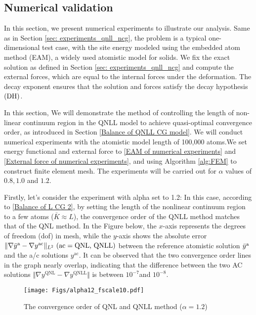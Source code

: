\subsection{Numerical validation}
\label{sec: experiments_qnll_cg}

In this section, we present numerical experiments to illustrate our analysis. Same as in Section \ref{sec: experiments_qnll_ncg}, the problem is a typical one-dimensional test case, with the site energy modeled using the embedded atom method (EAM), a widely used atomistic model for solids. We fix the exact solution as defined in Section \ref{sec: experiments_qnll_ncg} and compute the external forces, which are equal to the internal forces under the deformation. The decay exponent ensures that the solution and forces satisfy the decay hypothesis $\textbf{\rm (DH)}$.

In this section, We will demonstrate the method of controlling the length of non-linear continuum region in the QNLL model to achieve quasi-optimal convergence order, as introduced in Section \ref{Balance of QNLL CG model}. We will conduct numerical experiments with the atomistic model length of 100,000 atoms.We set energy functional and external force to \eqref{EAM of numerical experiments} and \eqref{External force of numerical experiments}, and using Algorithm \ref{alg:FEM} to construct finite element mesh. The experiments will be carried out for $\alpha$ values of $0.8, 1.0$ and $1.2$.

Firstly, let's consider the experiment with alpha set to 1.2: In this case, according to \eqref{Balance of L CG 2}, by setting the length of the nonlinear continuum region to a few atoms ($\bar{K} \approx L$), the convergence order of the QNLL method matches that of the QNL method. In the Figure below, the $x$-axis represents the degrees of freedom (dof) in mesh, while the $y$-axis shows the absolute error $\Vert \nabla \bar{y}^{{\rm a}} - \nabla y^{\text{ac}} \Vert_{L^{2}}~\text{(ac} = \text{QNL, QNLL)}$ between the reference atomistic solution $\bar{y}^{{\rm a}}$ and the a/c solutions $y^{\text{ac}}$. It can be observed that the two convergence order lines in the graph nearly overlap, indicating that the difference between the two AC solutions $\Vert \nabla y^{\text{QNL}} - \nabla y^{\text{QNLL}}\Vert$ is between $10^{-7} $and $10^{-8}$.

\begin{figure}[h]
	\centering 
	\texttt{[image: Figs/alpha12\_fscale10.pdf]}
	\caption{The convergence order of QNL and QNLL method ($\alpha = 1.2$)} %
	\label{fig: convergence_QNL_QNLL_alpha12_CG}
\end{figure}

